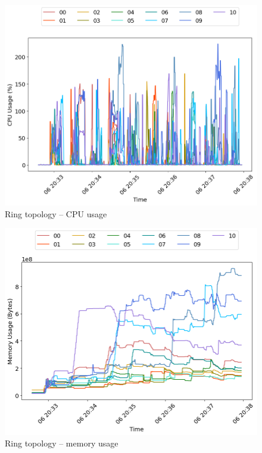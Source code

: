 \begin{minipage}{0.5\linewidth}
\begin{figure}[H]
\captionsetup{justification=centering,width=0.8\linewidth}
\includegraphics[width=\linewidth]{figures/ring/cpu_usage.png}
\caption{Ring topology -- CPU usage}
\label{fig:ring-cpu_usage}
\end{figure}
\end{minipage}
\begin{minipage}{0.5\linewidth}
\begin{figure}[H]
\captionsetup{justification=centering,width=0.8\linewidth}
\includegraphics[width=\linewidth]{figures/ring/mem_usage.png}
\caption{Ring topology -- memory usage}
\label{fig:ring-mem_usage}
\end{figure}
\end{minipage}

